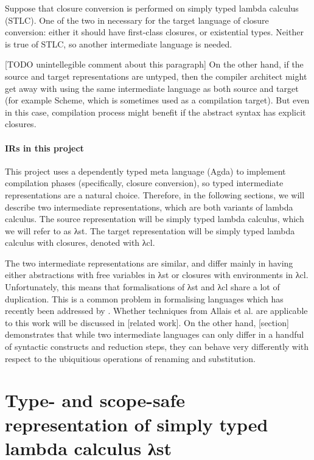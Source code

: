 \documentclass[bsc,frontabs,oneside,singlespacing,parskip,deptreport]{infthesis}
\theoremstyle{definition}
\theoremstyle{lemma}
\begin{document}
Suppose that closure conversion is performed on simply typed lambda
calculus (STLC). One of the two in necessary for the target language
of closure conversion: either it should have first-class closures, or
existential types. Neither is true of STLC, so another intermediate
language is needed.

[TODO unintellegible comment about this paragraph] On the other hand,
if the source and target representations are untyped, then the
compiler architect might get away with using the same intermediate
language as both source and target (for example Scheme, which is
sometimes used as a compilation target). But even in this case,
compilation process might benefit if the abstract syntax has explicit
closures.

\paragraph{IRs in this project} This project uses a dependently typed
meta language (Agda) to implement compilation phases (specifically,
closure conversion), so typed intermediate representations are a
natural choice. Therefore, in the following sections, we will describe
two intermediate representations, which are both variants of lambda
calculus. The source representation will be simply typed lambda
calculus, which we will refer to as λst. The target
representation will be simply typed lambda calculus with closures,
denoted with λcl.

The two intermediate representations are similar, and differ mainly in
having either abstractions with free variables in λst or closures with
environments in λcl. Unfortunately, this means that formalisations of
λst and λcl share a lot of duplication. This is a common problem in
formalising languages which has recently been addressed by
\cite{DBLP:journals/pacmpl/AllaisA0MM18}. Whether techniques from
Allais et al. are applicable to this work will be discussed in [related
work]. On the other hand, [section] demonstrates that while two
intermediate languages can only differ in a handful of syntactic
constructs and reduction steps, they can behave very differently with
respect to the ubiquitious operations of renaming and substitution.

\section{Type- and scope-safe representation of simply typed lambda
  calculus λst}
\end{document}
